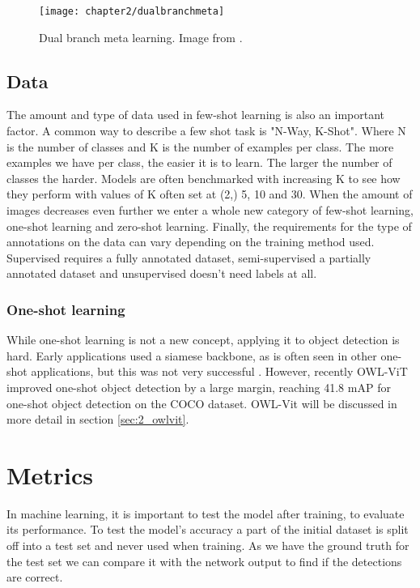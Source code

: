 \begin{figure}[H]
	\centering
	\texttt{[image: chapter2/dualbranchmeta]}
	\caption{\label{fig:2_dualbranchmeta} Dual branch meta learning. Image from \citet{few-shot-comprehensive-survey}.}
\end{figure}

\subsection{Data}

The amount and type of data used in few-shot learning is also an important factor. A common way to describe a few shot task is "N-Way, K-Shot". Where N is the number of classes and K is the number of examples per class. The more examples we have per class, the easier it is to learn. The larger the number of classes the harder. Models are often benchmarked with increasing K to see how they perform with values of K often set at (2,) 5, 10 and 30. When the amount of images decreases even further we enter a whole new category of few-shot learning, one-shot learning and zero-shot learning. Finally, the requirements for the type of annotations on the data can vary depending on the training method used. Supervised requires a fully annotated dataset, semi-supervised a partially annotated dataset and unsupervised doesn't need labels at all.

\subsubsection*{One-shot learning}

While one-shot learning is not a new concept, applying it to object detection is hard. Early applications used a siamese backbone, as is often seen in other one-shot applications, but this was not very successful \citep{One-shot-siamese}. However, recently OWL-ViT \citep{owlvit} improved one-shot object detection by a large margin, reaching 41.8 mAP for one-shot object detection on the COCO dataset. OWL-Vit will be discussed in more detail in section \ref{sec:2_owlvit}.


\section{Metrics}
In machine learning, it is important to test the model after training, to evaluate its performance. To test the model's accuracy a part of the initial dataset is split off into a test set and never used when training. As we have the ground truth for the test set we can compare it with the network output to find if the detections are correct. 

